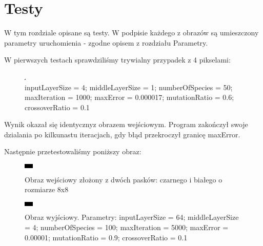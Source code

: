 \documentclass[12pt,a4paper,oneside]{article}
\begin{document}
\section{Testy}
W tym rozdziale opisane są testy. W podpisie każdego z obrazów są umieszczony parametry uruchomienia - zgodne opisem z rozdziału Parametry.

W pierwszych testach sprawdziliśmy trywialny przypadek z 4 pikselami:
\begin{figure}[h]
\centering
\includegraphics[width=.3\textwidth]{4x4}
\caption{inputLayerSize = 4; middleLayerSize = 1; numberOfSpecies = 50; maxIteration = 1000; maxError = 0.000017; mutationRatio = 0.6; crossoverRatio = 0.1}
\end{figure}
Wynik okazał się identycznyz obrazem wejściowym. Program zakończył swoje dzialania po kilkunastu iteracjach, gdy błąd przekroczył granicę maxError.

Następnie przetestowaliśmy poniższy obraz:

\begin{figure}[h]
\centering
\includegraphics[width=.3\textwidth]{gray2s}
\caption{Obraz wejściowy złożony z dwóch pasków: czarnego i białego o rozmiarze 8x8}
\end{figure}

\begin{figure}[H]
\centering
\includegraphics[width=.3\textwidth]{gray2s-o}
\caption{Obraz wyjściowy. Parametry: inputLayerSize = 64; middleLayerSize = 4; numberOfSpecies = 100; maxIteration = 5000; maxError = 0.00001; mutationRatio = 0.9; crossoverRatio = 0.1}
\end{figure}
\end{document}
